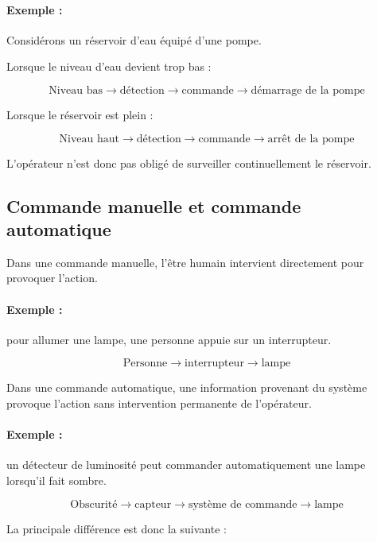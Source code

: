 \documentclass[12pt,a4paper]{book}
\begin{document}
\paragraph{Exemple :}
Considérons un réservoir d'eau équipé d'une pompe.

Lorsque le niveau d'eau devient trop bas :

\[
\text{Niveau bas} \rightarrow \text{détection} \rightarrow \text{commande} \rightarrow \text{démarrage de la pompe}
\]

Lorsque le réservoir est plein :

\[
\text{Niveau haut} \rightarrow \text{détection} \rightarrow \text{commande} \rightarrow \text{arrêt de la pompe}
\]

L'opérateur n'est donc pas obligé de surveiller continuellement le réservoir.

\subsection{Commande manuelle et commande automatique}

Dans une commande manuelle, l'être humain intervient directement pour provoquer l'action.

\paragraph{Exemple :} pour allumer une lampe, une personne appuie sur un interrupteur.

\[
\text{Personne} \rightarrow \text{interrupteur} \rightarrow \text{lampe}
\]

Dans une commande automatique, une information provenant du système provoque l'action sans intervention permanente de l'opérateur.

\paragraph{Exemple :} un détecteur de luminosité peut commander automatiquement une lampe lorsqu'il fait sombre.

\[
\text{Obscurité} \rightarrow \text{capteur} \rightarrow \text{système de commande} \rightarrow \text{lampe}
\]

La principale différence est donc la suivante :
\end{document}
